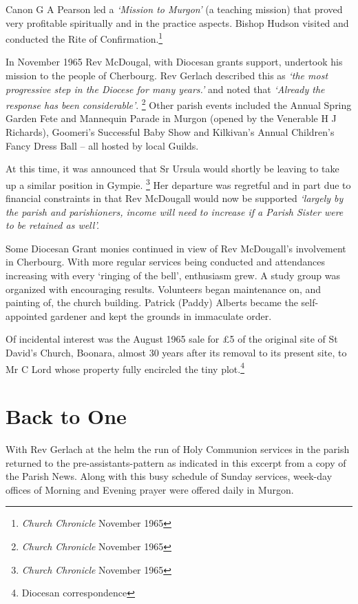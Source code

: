 Canon G A Pearson led a \emph{`Mission to Murgon'} (a teaching mission) that proved very profitable spiritually and in the practice aspects. Bishop Hudson visited and conducted the Rite of Confirmation.\footnote{\emph{Church Chronicle} November 1965}

In November 1965 Rev McDougal, with Diocesan grants support, undertook his mission to the people of Cherbourg. Rev Gerlach described this as \emph{`the most progressive step in the Diocese for many years.'} and noted that \emph{`Already the response has been considerable'}. \footnote{\emph{Church Chronicle} November 1965} Other parish events included the Annual Spring Garden Fete and Mannequin Parade in Murgon (opened by the Venerable H J Richards), Goomeri's Successful Baby Show and Kilkivan's Annual Children's Fancy Dress Ball -- all hosted by local Guilds.

At this time, it was announced that Sr Ursula would shortly be leaving to take up a similar position in Gympie. \footnote{\emph{Church Chronicle} November 1965} Her departure was regretful and in part due to financial constraints in that Rev McDougall would now be supported \emph{`largely by the parish and parishioners, income will need to increase if a Parish Sister were to be retained as well'.}

Some Diocesan Grant monies continued in view of Rev McDougall's involvement in Cherbourg. With more regular services being conducted and attendances increasing with every `ringing of the bell', enthusiasm grew. A study group was organized with encouraging results. Volunteers began maintenance on, and painting of, the church building. Patrick (Paddy) Alberts became the self-appointed gardener and kept the grounds in immaculate order.

Of incidental interest was the August 1965 sale for £5 of the original site of St David's Church, Boonara, almost 30 years after its removal to its present site, to Mr C Lord whose property fully encircled the tiny plot.\footnote{Diocesan correspondence}

\hypertarget{back-to-one}{%
\section{Back to One}\label{back-to-one}}

With Rev Gerlach at the helm the run of Holy Communion services in the parish returned to the pre-assistants-pattern as indicated in this excerpt from a copy of the Parish News. Along with this busy schedule of Sunday services, week-day offices of Morning and Evening prayer were offered daily in Murgon.

